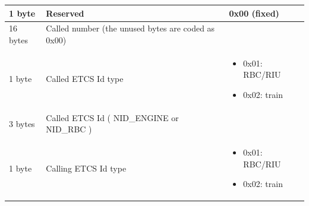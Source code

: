 \documentclass[nocc]{template/openetcs_report}
\begin{document}
\begin{longtable}{|l|l|l|}
				\hline
					\begin{minipage}[t]{0.1\linewidth}1 byte \end{minipage}
					&\begin{minipage}[t]{0.6\linewidth} Reserved	\end{minipage}
					&\begin{minipage}[t]{0.3\linewidth}0x00 (fixed) \end{minipage} \\
				
				\hline
					\begin{minipage}[t]{0.1\linewidth}16 bytes \end{minipage}
					&\begin{minipage}[t]{0.6\linewidth} Called number (the unused bytes are coded as 0x00)	\end{minipage}
					&\begin{minipage}[t]{0.3\linewidth} \end{minipage} \\
				
				\hline
					\begin{minipage}[t]{0.1\linewidth}1 byte \end{minipage}
					&\begin{minipage}[t]{0.6\linewidth} Called ETCS Id type	\end{minipage}
					&\begin{minipage}[t]{0.3\linewidth}
						\begin{itemize}
							\item 0x01: RBC/RIU
							\item 0x02: train
						\end{itemize}
					\end{minipage} \\
				
				\hline
					\begin{minipage}[t]{0.1\linewidth}3 bytes \end{minipage}
					&\begin{minipage}[t]{0.6\linewidth} Called ETCS Id ( NID\_ENGINE or NID\_RBC )	\end{minipage}
					&\begin{minipage}[t]{0.3\linewidth} \end{minipage} \\
				
				\hline
					\begin{minipage}[t]{0.1\linewidth}1 byte \end{minipage}
					&\begin{minipage}[t]{0.6\linewidth} Calling ETCS Id type\end{minipage}
					&\begin{minipage}[t]{0.3\linewidth}
						\begin{itemize}
							\item 0x01: RBC/RIU
							\item 0x02: train
						\end{itemize}
					\end{minipage} \\
				

\end{longtable}
\end{document}
